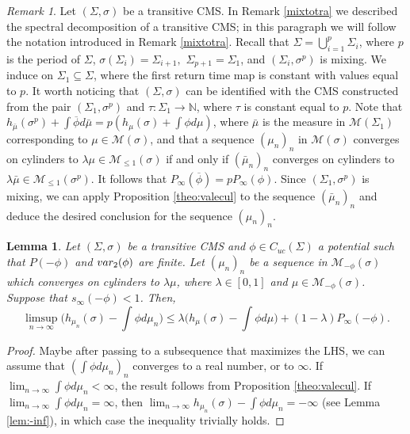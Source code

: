 \documentclass[letterpaper,11pt]{amsart}
\theoremstyle{plain}
\theoremstyle{plain}
\newtheorem{lemma}[proposition]{Lemma}
\theoremstyle{definition}
\theoremstyle{remark}
\newtheorem{remark}{Remark}[section]
\def\N{{\mathbb N}}
\def\M{{\mathcal M}}
\begin{document}
\begin{remark}\label{rem:valeric} Let $(\Sigma,\sigma)$ be a transitive CMS. In Remark \ref{mixtotra} we described the spectral decomposition of a transitive CMS; in this paragraph we will follow the notation introduced in Remark \ref{mixtotra}.  Recall that $\Sigma=\bigcup_{i=1}^p \Sigma_i$, where $p$ is the period of $\Sigma$, $\sigma(\Sigma_i)=\Sigma_{i+1},$ $\Sigma_{p+1}=\Sigma_1$, and $(\Sigma_i,\sigma^p)$ is mixing. We induce on $\Sigma_1\subseteq \Sigma$, where the first return time map is constant with values equal to $p$. It worth noticing that $(\Sigma,\sigma)$ can be identified with the CMS constructed from the pair $(\Sigma_1,\sigma^p)$ and $\tau:\Sigma_1\to\N$, where $\tau$  is constant equal to $p$. Note that $h_{\bar{\mu}}(\sigma^p)+\int \overline{\phi}d\bar{\mu}=p(h_\mu(\sigma)+\int \phi d\mu)$, where $\bar{\mu}$ is the measure in $\M(\Sigma_1)$ corresponding to $\mu\in \M(\sigma)$, and that a sequence $(\mu_n)_n$ in $\M(\sigma)$ converges on cylinders to $\lambda\mu\in\M_{\le 1}(\sigma)$ if and only if $(\bar{\mu}_n)_n$ converges on cylinders to $\lambda\bar{\mu}\in\M_{\le1}(\sigma^p)$. It follows that  $P_\infty(\overline{\phi})=pP_\infty(\phi)$. Since $(\Sigma_1,\sigma^p)$ is mixing, we can apply Proposition \ref{theo:valecul} to the sequence $(\bar{\mu}_n)_n$ and deduce the desired conclusion for the sequence $(\mu_n)_n$.
\end{remark} 

\begin{lemma}\label{lem:valeo}  Let $(\Sigma,\sigma)$ be a transitive CMS and $\phi\in C_{uc}(\Sigma)$ a potential such that $P(-\phi)$ and $\emph{var}_2(\phi)$ are finite.  Let $(\mu_n)_n$ be a sequence  in $\M_{-\phi}(\sigma)$ which converges on cylinders to $\lambda\mu$, where $\lambda\in [0,1]$ and $\mu\in\M_{-\phi}(\sigma)$. Suppose that $s_\infty(-\phi)<1$. Then,
$$\limsup_{n\to\infty}\big(h_{\mu_n}(\sigma)-\int \phi d\mu_n\big)\le \lambda\big(h_\mu(\sigma)-\int \phi d\mu\big)+(1-\lambda)P_\infty(-\phi).$$
\end{lemma}
\begin{proof} Maybe after passing to a subsequence that maximizes the LHS, we can assume that $(\int \phi d\mu_n)_n$ converges to a real number, or to $\infty$. If $\lim_{n\to\infty}\int \phi d\mu_n<\infty$, the result follows from Proposition \ref{theo:valecul}. If $\lim_{n\to\infty}\int \phi d\mu_n=\infty$, then $\lim_{n\to\infty}h_{\mu_n}(\sigma)-\int \phi d\mu_n=-\infty$ (see Lemma \ref{lem:-inf}), in which case the inequality trivially holds.
\end{proof}
\end{document}
